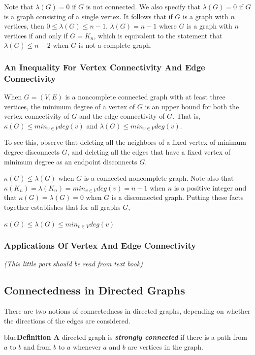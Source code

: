 \documentclass[11pt]{article}
\newenvironment{definition}[1]{\begin{mybox}{blue}{\textbf{Definition #1}}}{\end{mybox}}
\begin{document}
Note that $\lambda(G) = 0$ if $G$ is not connected. We also specify that $\lambda(G) = 0$ if $G$ is a graph consisting of a single vertex. It follows that if $G$ is a graph with $n$ vertices, then $0 \leq \lambda(G) \leq n-1$. $\lambda(G) = n-1$ where $G$ is a graph with $n$ vertices if and only if
$G = K_n$, which is equivalent to the statement that $\lambda(G) \leq n-2$ when $G$ is not a complete graph.

\subsubsection{An Inequality For Vertex Connectivity And Edge Connectivity}

When $G = (V, E)$ is a noncomplete connected graph with at least three vertices, the minimum degree of a vertex of $G$ is an upper bound for both the vertex connectivity of $G$ and the edge connectivity of $G$. That is, $\kappa(G) \leq min_{v \in V} deg(v)$ and $\lambda(G) \leq min_{v \in V} deg(v)$. 

To see this, observe that deleting all the neighbors of a fixed vertex of minimum degree disconnects $G$, and deleting all the edges that have a fixed vertex of minimum degree as an endpoint disconnects $G$.

$\kappa(G) \leq \lambda(G)$ when $G$ is a connected noncomplete graph. Note also that $\kappa(K_n) = \lambda(K_n) = min_{v \in V} deg(v) = n-1$ when $n$ is a positive integer and that $\kappa(G) = \lambda(G) = 0$ when $G$ is a disconnected graph. Putting these facts together establishes that for all graphs $G$,

$ \kappa(G) \leq \lambda(G) \leq min_{v \in V} deg(v) $

\subsubsection{Applications Of Vertex And Edge Connectivity}

\textit{(This little part should be read from text book)}

\subsection{Connectedness in Directed Graphs}

There are two notions of connectedness in directed graphs, depending on whether the directions of the edges are considered.

\begin{definition}{4}
A directed graph is \textit{\textbf{strongly connected}} if there is a path from $a$ to $b$ and from $b$ to $a$ whenever $a$ and $b$ are vertices in the graph.
\end{definition}
\end{document}
